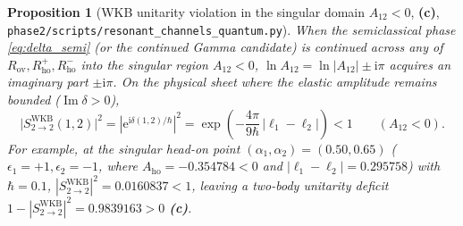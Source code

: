 \documentclass[11pt,a4paper]{article}
\newcommand{\Lc}{\textsf{\textbf{(c)}}\xspace}
\newcommand{\ii}{\mathrm{i}}
\newcommand{\ee}{\mathrm{e}}
\newcommand{\hb}{\hbar}
\newcommand{\squant}{\texttt{phase2/\allowbreak scripts/\allowbreak resonant\_\allowbreak channels\_\allowbreak quantum.py}}
\newtheorem{proposition}{Proposition}[section]
\theoremstyle{remark}
\begin{document}
\begin{proposition}[WKB unitarity violation in the singular domain $A_{12}<0$, \Lc, \squant]\label{prop:unitarity_deficit}
When the semiclassical phase \eqref{eq:delta_semi} (or the continued Gamma
candidate) is continued across any of $R_{\mathrm{ov}},R_{\mathrm{ho}}^+,
R_{\mathrm{ho}}^-$ into the singular region $A_{12} < 0$, $\ln A_{12} = \ln|A_{12}| \pm \ii\pi$
acquires an imaginary part $\pm\ii\pi$. On the physical sheet where the elastic
amplitude remains bounded ($\operatorname{Im}\delta > 0$),
\begin{equation}\label{eq:wkb_deficit}
  \boxed{\;
  \big|S_{2\to 2}^{\mathrm{WKB}}(1,2)\big|^2
  = \left|\ee^{\ii\delta(1,2)/\hb}\right|^2
  = \exp\!\left(-\frac{4\pi}{9\hb}\,\big|\ell_1 - \ell_2\big|\right) < 1
  \qquad (A_{12} < 0).
  \;}
\end{equation}
For example, at the singular head-on point $(\alpha_1,\alpha_2)=(0.50,0.65)$
($\epsilon_1=+1,\epsilon_2=-1$, where $A_{\mathrm{ho}} = -0.354784 < 0$ and
$|\ell_1-\ell_2| = 0.295758$) with $\hb=0.1$, $|S_{2\to 2}^{\mathrm{WKB}}|^2 = 0.0160837 < 1$,
leaving a two-body unitarity deficit $1 - |S_{2\to 2}^{\mathrm{WKB}}|^2 = 0.9839163 > 0$ \Lc.
\end{proposition}
\end{document}
